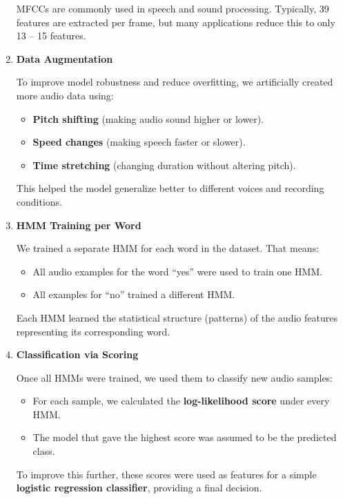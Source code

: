 \documentclass{article}
\begin{document}
\begin{enumerate}
    MFCCs are commonly used in speech and sound processing. Typically, 39 features are extracted per frame, but many applications reduce this to only 13 – 15 features. 

    \item \textbf{Data Augmentation}

    To improve model robustness and reduce overfitting, we artificially created more audio data using:
    \begin{itemize}
        \item \textbf{Pitch shifting} (making audio sound higher or lower).
        \item \textbf{Speed changes} (making speech faster or slower).
        \item \textbf{Time stretching} (changing duration without altering pitch).
    \end{itemize}
    
    This helped the model generalize better to different voices and recording conditions.
    
    \item \textbf{HMM Training per Word}
    
    We trained a separate HMM for each word in the dataset. That means:
    \begin{itemize}
        \item All audio examples for the word “yes” were used to train one HMM.
        \item All examples for “no” trained a different HMM.
    \end{itemize}
    
    Each HMM learned the statistical structure (patterns) of the audio features representing its corresponding word.

    \item \textbf{Classification via Scoring}

    Once all HMMs were trained, we used them to classify new audio samples:
    \begin{itemize}
        \item For each sample, we calculated the \textbf{log-likelihood score} under every HMM.
        \item The model that gave the highest score was assumed to be the predicted class.
    \end{itemize}
    
    To improve this further, these scores were used as features for a simple \textbf{logistic regression classifier}, providing a final decision.

\end{enumerate}    
\end{document}
